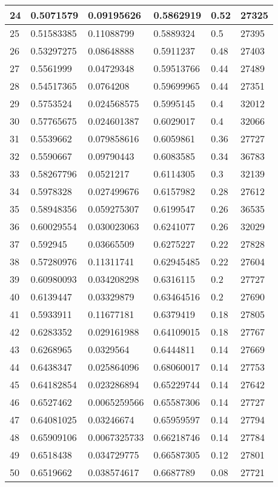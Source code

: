 \begin{longtable}{|l|l|l|l|l|l|}
24 & 0.5071579 & 0.09195626 & 0.5862919 & 0.52 & 27325 \\ \hline 
25 & 0.51583385 & 0.11088799 & 0.5889324 & 0.5 & 27395 \\ \hline 
26 & 0.53297275 & 0.08648888 & 0.5911237 & 0.48 & 27403 \\ \hline 
27 & 0.5561999 & 0.04729348 & 0.59513766 & 0.44 & 27489 \\ \hline 
28 & 0.54517365 & 0.0764208 & 0.59699965 & 0.44 & 27351 \\ \hline 
29 & 0.5753524 & 0.024568575 & 0.5995145 & 0.4 & 32012 \\ \hline 
30 & 0.57765675 & 0.024601387 & 0.6029017 & 0.4 & 32066 \\ \hline 
31 & 0.5539662 & 0.079858616 & 0.6059861 & 0.36 & 27727 \\ \hline 
32 & 0.5590667 & 0.09790443 & 0.6083585 & 0.34 & 36783 \\ \hline 
33 & 0.58267796 & 0.0521217 & 0.6114305 & 0.3 & 32139 \\ \hline 
34 & 0.5978328 & 0.027499676 & 0.6157982 & 0.28 & 27612 \\ \hline 
35 & 0.58948356 & 0.059275307 & 0.6199547 & 0.26 & 36535 \\ \hline 
36 & 0.60029554 & 0.030023063 & 0.6241077 & 0.26 & 32029 \\ \hline 
37 & 0.592945 & 0.03665509 & 0.6275227 & 0.22 & 27828 \\ \hline 
38 & 0.57280976 & 0.11311741 & 0.62945485 & 0.22 & 27604 \\ \hline 
39 & 0.60980093 & 0.034208298 & 0.6316115 & 0.2 & 27727 \\ \hline 
40 & 0.6139447 & 0.03329879 & 0.63464516 & 0.2 & 27690 \\ \hline 
41 & 0.5933911 & 0.11677181 & 0.6379419 & 0.18 & 27805 \\ \hline 
42 & 0.6283352 & 0.029161988 & 0.64109015 & 0.18 & 27767 \\ \hline 
43 & 0.6268965 & 0.0329564 & 0.6444811 & 0.14 & 27669 \\ \hline 
44 & 0.6438347 & 0.025864096 & 0.68060017 & 0.14 & 27753 \\ \hline 
45 & 0.64182854 & 0.023286894 & 0.65229744 & 0.14 & 27642 \\ \hline 
46 & 0.6527462 & 0.0065259566 & 0.65587306 & 0.14 & 27727 \\ \hline 
47 & 0.64081025 & 0.03246674 & 0.65959597 & 0.14 & 27794 \\ \hline 
48 & 0.65909106 & 0.0067325733 & 0.66218746 & 0.14 & 27784 \\ \hline 
49 & 0.6518438 & 0.034729775 & 0.66587305 & 0.12 & 27801 \\ \hline 
50 & 0.6519662 & 0.038574617 & 0.6687789 & 0.08 & 27721 \\ \hline 
\end{longtable}